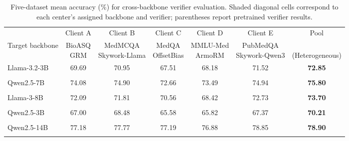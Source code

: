 \begin{table}[!t]
\centering
\small
\setlength{\tabcolsep}{4pt}
\renewcommand{\arraystretch}{1.05}

\begin{tabular}{lccccc@{\hspace{14pt}}c}
\toprule
& Client A & Client B & Client C & Client D & Client E & Pool \\
\cmidrule(lr){2-6}\cmidrule(lr){7-7}
Target backbone
& \shortstack{BioASQ\\GRM}
& \shortstack{MedMCQA\\Skywork-Llama}
& \shortstack{MedQA\\OffsetBias}
& \shortstack{MMLU-Med\\ArmoRM}
& \shortstack{PubMedQA\\Skywork-Qwen3}
& \shortstack{\ours{}\\(Heterogeneous)} \\
\midrule

Llama-3.2-3B & \cellcolor[HTML]{FFF8DC}69.69 & 70.95 & 67.51 & 68.18 & 71.52 & \textbf{72.85} \\[-2pt]
& \cellcolor[HTML]{FFF8DC}{\footnotesize(65.74)} & & & & & \\[6pt]

Qwen2.5-7B & 74.08 & \cellcolor[HTML]{FFF8DC}74.90 & 72.66 & 73.49 & 74.94 & \textbf{75.80} \\[-2pt]
& & \cellcolor[HTML]{FFF8DC}{\footnotesize(71.25)} & & & & \\[6pt]

Llama-3-8B & 72.09 & 71.81 & \cellcolor[HTML]{FFF8DC}70.56 & 68.42 & 72.73 & \textbf{73.70} \\[-2pt]
& & & \cellcolor[HTML]{FFF8DC}{\footnotesize(60.82)} & & & \\[6pt]

Qwen2.5-3B & 67.00 & 68.48 & 65.58 & \cellcolor[HTML]{FFF8DC}65.82 & 67.37 & \textbf{70.21} \\[-2pt]
& & & & \cellcolor[HTML]{FFF8DC}{\footnotesize(64.10)} & & \\[6pt]

Qwen2.5-14B & 77.18 & 77.77 & 77.19 & 76.88 & \cellcolor[HTML]{FFF8DC}78.85 & \textbf{78.90} \\[-2pt]
& & & & & \cellcolor[HTML]{FFF8DC}{\footnotesize(74.46)} & \\

\bottomrule
\end{tabular}

\caption{Five-dataset mean accuracy (\%) for cross-backbone verifier evaluation. Shaded diagonal cells correspond to each center's assigned backbone and verifier; parentheses report pretrained verifier results.}
\label{tab:cross_generator}
\end{table}
